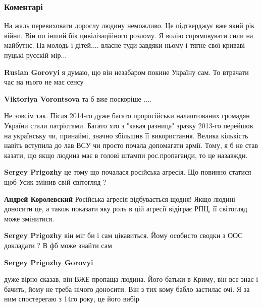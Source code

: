  
 
 
 
 
\subsubsection{Коментарі}

\begin{itemize} %

На жаль перевиховати дорослу людину неможливо. Це підтверджує вже який рік
війни. Він по інший бік цивілізаційного розлому. Я волію спрямовувати сили на
майбутнє. На молодь і дітей.... власне туди завдяки ньому і тягне свої криваві
пуцькі русскій мір...

\begin{itemize} %
\textbf{Ruslan Gorovyi} я думаю, що він незабаром покине Україну сам. То втрачати час на нього не має сенсу

\textbf{Viktoriya Vorontsova} та б вже поскоріше ....


Не зовсім так. Після 2014-го дуже багато проросійськи налаштованих громадян
України стали патріотами. Багато хто з "какая разница" зразку 2013-го перейшов
на українську чи, принаймі, значно збільшив її використання. Велика кількість
навіть вступила до лав ВСУ чи просто почала допомагати армії. Тому, я б не став
казати, що якщо людина має в голові штампи рос.пропаганди, то це назавжди.

\textbf{Sergey Prigozhy} це тому що почалася російська агресія. Що повинно статися щоб Усик змінив свій світогляд ?

\textbf{Андрей Королевский} Російська агресія відбувається щодня! Якщо людині доносити це, а також показати яку роль в цій агресії відіграє РПЦ, її світогляд може змінитися.

\textbf{Sergey Prigozhy} він міг би і сам цікавиться. Йому особисто сводки з ООС докладати ? В фб може знайти сам

\textbf{Sergey Prigozhy Gorovyi} 

дуже вірно сказав, він ВЖЕ пропаща людина. Його батьки в Криму, він все знає і
бачить, йому не треба нічого доносити. Він з тих кому бабло застилає очі. Я за
ним спостерегаю з 14го року, це його вибір


\end{itemize}
\end{itemize}

